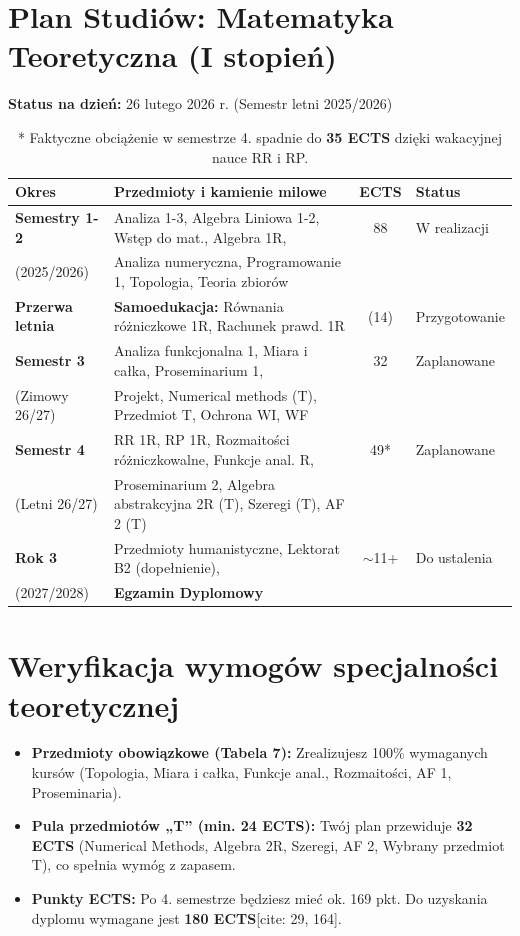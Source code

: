 \documentclass{article}
\begin{document}
\section*{Plan Studiów: Matematyka Teoretyczna (I stopień)}

\noindent \textbf{Status na dzień:} 26 lutego 2026 r. (Semestr letni 2025/2026)

\begin{table}[h!]
\centering
\small
\begin{tabularx}{\textwidth}{@{} l X c l @{}}
\toprule
\textbf{Okres} & \textbf{Przedmioty i kamienie milowe} & \textbf{ECTS} & \textbf{Status} \\ \midrule
\textbf{Semestry 1-2} & Analiza 1-3, Algebra Liniowa 1-2, Wstęp do mat., Algebra 1R, & 88 & W realizacji \\ 
(2025/2026) & Analiza numeryczna, Programowanie 1, Topologia, Teoria zbiorów & & \\ \midrule
\textbf{Przerwa letnia} & \textbf{Samoedukacja:} Równania różniczkowe 1R, Rachunek prawd. 1R & (14) & Przygotowanie \\ \midrule
\textbf{Semestr 3} & Analiza funkcjonalna 1, Miara i całka, Proseminarium 1, & 32 & Zaplanowane \\ 
(Zimowy 26/27) & Projekt, Numerical methods (T), Przedmiot T, Ochrona WI, WF & & \\ \midrule
\textbf{Semestr 4} & RR 1R, RP 1R, Rozmaitości różniczkowalne, Funkcje anal. R, & 49* & Zaplanowane \\ 
(Letni 26/27) & Proseminarium 2, Algebra abstrakcyjna 2R (T), Szeregi (T), AF 2 (T) & & \\ \midrule
\textbf{Rok 3} & Przedmioty humanistyczne, Lektorat B2 (dopełnienie), & $\sim$11+ & Do ustalenia \\ 
(2027/2028) & \textbf{Egzamin Dyplomowy} & & \\ \bottomrule
\end{tabularx}
\caption*{* Faktyczne obciążenie w semestrze 4. spadnie do \textbf{35 ECTS} dzięki wakacyjnej nauce RR i RP.}
\end{table}

\section*{Weryfikacja wymogów specjalności teoretycznej}

\begin{itemize}
    \item \textbf{Przedmioty obowiązkowe (Tabela 7):} Zrealizujesz 100\% wymaganych kursów (Topologia, Miara i całka, Funkcje anal., Rozmaitości, AF 1, Proseminaria).
    \item \textbf{Pula przedmiotów „T” (min. 24 ECTS):} Twój plan przewiduje \textbf{32 ECTS} (Numerical Methods, Algebra 2R, Szeregi, AF 2, Wybrany przedmiot T), co spełnia wymóg z zapasem.
    \item \textbf{Punkty ECTS:} Po 4. semestrze będziesz mieć ok. 169 pkt. Do uzyskania dyplomu wymagane jest \textbf{180 ECTS}[cite: 29, 164].
\end{itemize}
\end{document}
